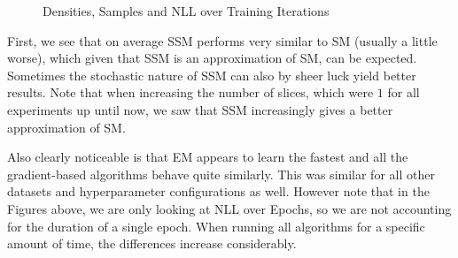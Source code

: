 \begin{figure}[H]
    \centering
    \caption{Densities, Samples and NLL over Training Iterations}
    \label{fig:halfmoons_10_logp}
\end{figure}

First, we see that on average SSM performs very similar to SM (usually a little worse), which 
given that SSM is an approximation of SM, can be expected. Sometimes the stochastic nature of SSM can also 
by sheer luck yield better results. Note that when increasing the number of slices, which were $1$ for all 
experiments up until now, we saw that SSM increasingly gives a better approximation of SM.

Also clearly noticeable is that EM appears to learn the fastest and all the gradient-based algorithms
behave quite similarly. This was similar for all other datasets and hyperparameter configurations as well. 
However note that in the Figures above, we are only looking at NLL over Epochs, so we are not accounting for the 
duration of a single epoch. When running all algorithms for a specific amount of time, the differences increase considerably. 

